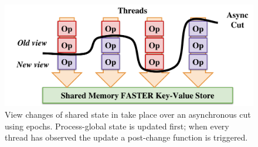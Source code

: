 \begin{figure}[t]
\centering
\includegraphics[width=\columnwidth]{figures/global-cut.pdf}
\caption{View changes of shared state in \faster take place over
    an asynchronous cut using epochs. Process-global state is updated first; when
    every thread has observed the update a post-change function is triggered.}
\label{fig:cut}
\end{figure}
